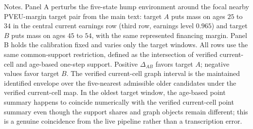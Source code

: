 \begin{table}[t]
\centering
\caption{Calibration and target-window sensitivity on common support for the nearby diagnostic pair}
\label{tab:policy-sensitivity}
\footnotesize
\renewcommand{\arraystretch}{1.08}
\begin{minipage}{0.98\textwidth}
\footnotesize Notes. Panel A perturbs the five-state hump environment around the focal nearby PVEU-margin target pair from the main text: target $A$ puts mass on ages $25$ to $34$ in the central current earnings row (third row, earnings level $0.965$) and target $B$ puts mass on ages $45$ to $54$, with the same represented financing margin. Panel B holds the calibration fixed and varies only the target windows. All rows use the same common-support restriction, defined as the intersection of verified current-cell and age-based one-step support. Positive $\Delta_{AB}$ favors target $A$; negative values favor target $B$. The verified current-cell graph interval is the maintained identified envelope over the five-nearest admissible older candidates under the verified current-cell map. In the oldest target window, the age-based point summary happens to coincide numerically with the verified current-cell point summary even though the support shares and graph objects remain different; this is a genuine coincidence from the live pipeline rather than a transcription error.
\end{minipage}
\end{table}
